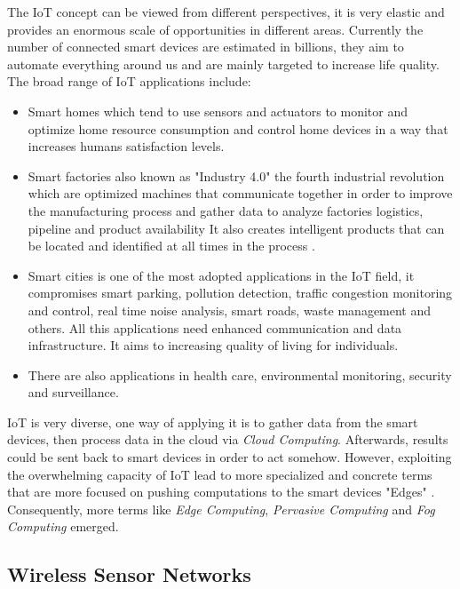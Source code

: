 The IoT concept can be viewed from different perspectives, it is very elastic and provides an enormous scale of opportunities in different areas. Currently the number of connected smart devices are estimated in billions, they aim to automate everything around us and are mainly targeted to increase life quality. The broad range of IoT applications include:
\begin{itemize}
\item Smart homes which tend to use sensors and actuators to monitor and optimize home resource consumption and control home devices in a way that increases humans satisfaction levels. 
\item Smart factories also known as "Industry 4.0" the fourth industrial revolution which are optimized machines that communicate together in order to improve the manufacturing process and gather data to analyze factories logistics, pipeline and product availability It also creates intelligent products that can be located and identified at all times in the process \cite{Gilchrist:2016:III:2994178}.

\item Smart cities is one of the most adopted applications in the IoT field, it compromises smart parking,  pollution detection, traffic congestion monitoring and control, real time noise analysis, smart roads, waste management and others.  All this applications need enhanced communication and data infrastructure. It aims to increasing quality of living for individuals.

\item There are also applications in  health care, environmental monitoring, security and surveillance.
\end{itemize}

IoT is very diverse, one way of applying it is to gather data from the smart devices, then process data in the cloud via \textit{Cloud Computing}. Afterwards, results could be sent back to smart devices in order to act somehow. However, exploiting the overwhelming capacity of IoT lead to more specialized and concrete terms that are more focused on pushing computations to the smart devices "Edges" . Consequently, more terms like 
\textit{Edge Computing}, \textit{Pervasive Computing} and \textit{Fog Computing} emerged.


\subsection{ Wireless Sensor Networks}

